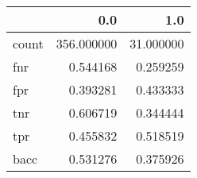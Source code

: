 \begin{tabular}{lrr}
\toprule
{} &         0.0 &        1.0 \\
\midrule
count &  356.000000 &  31.000000 \\
fnr   &    0.544168 &   0.259259 \\
fpr   &    0.393281 &   0.433333 \\
tnr   &    0.606719 &   0.344444 \\
tpr   &    0.455832 &   0.518519 \\
bacc  &    0.531276 &   0.375926 \\
\bottomrule
\end{tabular}
